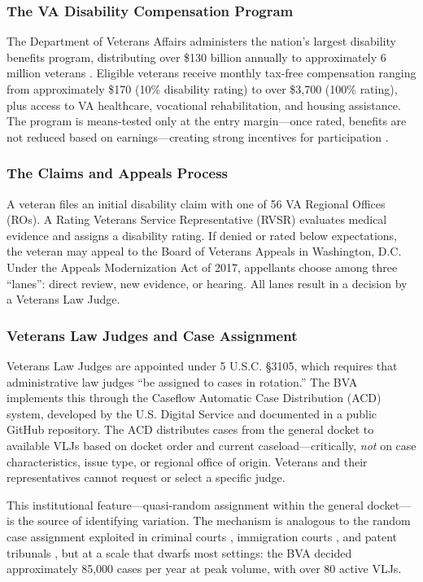 \documentclass[12pt]{article}
\begin{document}
\subsubsection*{The VA Disability Compensation Program} The Department of Veterans Affairs administers the nation's largest disability benefits program, distributing over \$130 billion annually to approximately 6 million veterans \citep{autor2016va}. Eligible veterans receive monthly tax-free compensation ranging from approximately \$170 (10\% disability rating) to over \$3,700 (100\% rating), plus access to VA healthcare, vocational rehabilitation, and housing assistance. The program is means-tested only at the entry margin---once rated, benefits are not reduced based on earnings---creating strong incentives for participation \citep{autor2003,autor2006jep,coile2021}.

\subsubsection*{The Claims and Appeals Process} A veteran files an initial disability claim with one of 56 VA Regional Offices (ROs). A Rating Veterans Service Representative (RVSR) evaluates medical evidence and assigns a disability rating. If denied or rated below expectations, the veteran may appeal to the Board of Veterans Appeals in Washington, D.C. Under the Appeals Modernization Act of 2017, appellants choose among three ``lanes'': direct review, new evidence, or hearing. All lanes result in a decision by a Veterans Law Judge.

\subsubsection*{Veterans Law Judges and Case Assignment} Veterans Law Judges are appointed under 5 U.S.C. \S3105, which requires that administrative law judges ``be assigned to cases in rotation.'' The BVA implements this through the Caseflow Automatic Case Distribution (ACD) system, developed by the U.S. Digital Service and documented in a public GitHub repository. The ACD distributes cases from the general docket to available VLJs based on docket order and current caseload---critically, \textit{not} on case characteristics, issue type, or regional office of origin. Veterans and their representatives cannot request or select a specific judge.

This institutional feature---quasi-random assignment within the general docket---is the source of identifying variation. The mechanism is analogous to the random case assignment exploited in criminal courts \citep{kling2006,dobbie2018}, immigration courts \citep{ramji2007}, and patent tribunals \citep{galasso2015}, but at a scale that dwarfs most settings: the BVA decided approximately 85,000 cases per year at peak volume, with over 80 active VLJs.
\end{document}
